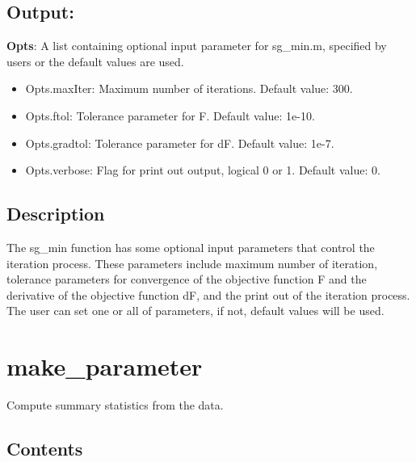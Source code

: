 \documentclass[a4paper,11pt,openany]{memoir}
\begin{document}
\subsection*{Output:}

\begin{par}
\textbf{Opts}: A list containing optional input parameter for sg\_min.m, specified by users or the default values are used.
\end{par} \vspace{1em}
\begin{itemize}
\setlength{\itemsep}{-1ex}
   \item Opts.maxIter: Maximum number of iterations.  Default value: 300.
   \item Opts.ftol: Tolerance parameter for F.  Default value: 1e-10.
   \item Opts.gradtol: Tolerance parameter for dF.  Default value: 1e-7.
   \item Opts.verbose: Flag for print out output, logical 0 or 1. Default value: 0.
\end{itemize}


\subsection*{Description}

\begin{par}
The sg\_min function has some optional input parameters that control the iteration process.  These parameters include maximum number of iteration, tolerance parameters for convergence of the objective function F and the derivative of the objective function dF, and the print out of the iteration process.  The user can set one or all of parameters, if not, default values will be used.
\end{par} \vspace{1em}

\newpage

\rmfamily
\color{black}\section{make\_parameter}

\begin{par}
Compute summary statistics from the data.
\end{par} \vspace{1em}

\subsection*{Contents}
\end{document}
